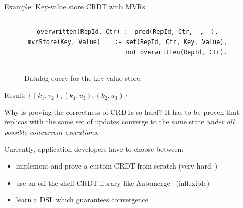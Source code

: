 \documentclass[USenglish,aspectratio=169]{beamer} %
\begin{document}
\begin{frame}[fragile]{Example: Key-value store \acs{CRDT} with \aclp{MVR}}
    \begin{figure}
        \centering
        \begin{tabular}{c}
        \begin{lstlisting}[keepspaces]
overwritten(RepId, Ctr) :- pred(RepId, Ctr, _, _).
mvrStore(Key, Value)    :- set(RepId, Ctr, Key, Value),
                           not overwritten(RepId, Ctr).\end{lstlisting}
        \end{tabular}
        \caption{Datalog query for the key-value store.}\label{code:mvr-store-datalog-dialect}
    \end{figure}

    \pause
    \begin{center}
        Result: \(\{ (k_1, v_2), (k_1, v_3), (k_2, u_3) \}\)
    \end{center}
\end{frame}

\begin{frame}
    \begin{itemize}
    \end{itemize}
\end{frame}

\begin{frame}{Why is proving the correctness of \acsp{CRDT} so hard?}
    It has to be proven that replicas with the same set of updates
    converge to the same state \emph{under all possible concurrent executions}.

    \pause
    Currently, application developers have to choose between:
    \begin{itemize}
        \item implement and prove a custom \ac{CRDT} from scratch
              (very hard~\cite{kleppmann2022assessing,gomes2017verifying})
        \item use an off-the-shelf \ac{CRDT} library like Automerge~\cite{automerge}
              (inflexible)
        \item learn a \acs{DSL} which guarantees convergence~\cite{verifx,lore,propel}
    \end{itemize}
\end{frame}
\end{document}
